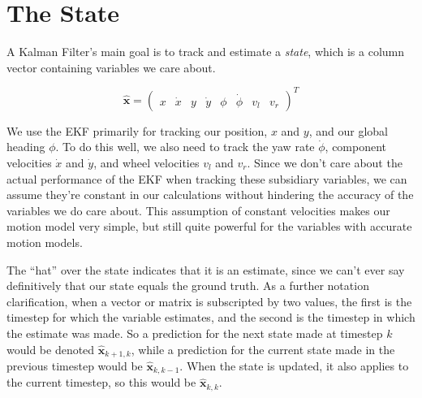 \section{The State}

A Kalman Filter's main goal is to track and estimate a \textit{state}, which is a column vector containing variables we care about.

\begin{equation}
    \boldsymbol{\hat{x}} = 
    \begin{pmatrix}
    x & \dot{x} & y & \dot{y} & \phi & \dot{\phi} & v_l & v_r
    \end{pmatrix} ^ T
\end{equation}

We use the EKF primarily for tracking our position, $x$ and $y$, and our global heading $\phi$. To do this well, we also need to track the yaw rate $\dot{\phi}$, component velocities $\dot{x}$ and $\dot{y}$, and wheel velocities $v_l$ and $v_r$. Since we don't care about the actual performance of the EKF when tracking these subsidiary variables, we can assume they're constant in our calculations without hindering the accuracy of the variables we do care about. This assumption of constant velocities makes our motion model very simple, but still quite powerful for the variables with accurate motion models.

The ``hat'' over the state indicates that it is an estimate, since we can't ever say definitively that our state equals the ground truth. As a further notation clarification, when a vector or matrix is subscripted by two values, the first is the timestep for which the variable estimates, and the second is the timestep in which the estimate was made. So a prediction for the next state made at timestep $k$ would be denoted $\boldsymbol{\hat{x}}_{k+1,k}$, while a prediction for the current state made in the previous timestep would be $\boldsymbol{\hat{x}}_{k,k-1}$. When the state is updated, it also applies to the current timestep, so this would be $\boldsymbol{\hat{x}}_{k,k}$. 